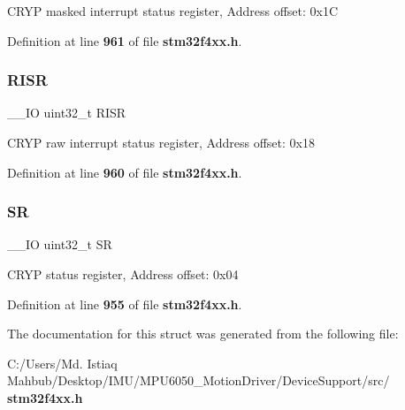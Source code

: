 C\+R\+YP masked interrupt status register, Address offset\+: 0x1C 

Definition at line \textbf{ 961} of file \textbf{ stm32f4xx.\+h}.

\mbox{\label{structCRYP__TypeDef_aa196fddf0ba7d6e3ce29bdb04eb38b94}} 
\subsubsection{R\+I\+SR}
{\footnotesize\ttfamily \+\_\+\+\_\+\+IO uint32\+\_\+t R\+I\+SR}

C\+R\+YP raw interrupt status register, Address offset\+: 0x18 

Definition at line \textbf{ 960} of file \textbf{ stm32f4xx.\+h}.

\mbox{\label{structCRYP__TypeDef_af6aca2bbd40c0fb6df7c3aebe224a360}} 
\subsubsection{SR}
{\footnotesize\ttfamily \+\_\+\+\_\+\+IO uint32\+\_\+t SR}

C\+R\+YP status register, Address offset\+: 0x04 

Definition at line \textbf{ 955} of file \textbf{ stm32f4xx.\+h}.



The documentation for this struct was generated from the following file\+:\begin{DoxyCompactItemize}
\item 
C\+:/\+Users/\+Md. Istiaq Mahbub/\+Desktop/\+I\+M\+U/\+M\+P\+U6050\+\_\+\+Motion\+Driver/\+Device\+Support/src/\textbf{ stm32f4xx.\+h}\end{DoxyCompactItemize}
